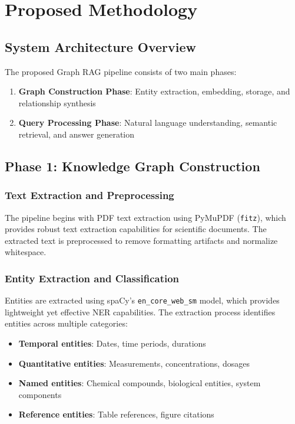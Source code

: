 \documentclass[conference]{IEEEtran}
\begin{document}
\section{Proposed Methodology}

\subsection{System Architecture Overview}
The proposed Graph RAG pipeline consists of two main phases:
\begin{enumerate}
\item \textbf{Graph Construction Phase}: Entity extraction, embedding, storage, and relationship synthesis
\item \textbf{Query Processing Phase}: Natural language understanding, semantic retrieval, and answer generation
\end{enumerate}

\subsection{Phase 1: Knowledge Graph Construction}

\subsubsection{Text Extraction and Preprocessing}
The pipeline begins with PDF text extraction using PyMuPDF (\texttt{fitz}), which provides robust text extraction capabilities for scientific documents. The extracted text is preprocessed to remove formatting artifacts and normalize whitespace.

\subsubsection{Entity Extraction and Classification}
Entities are extracted using spaCy's \texttt{en\_core\_web\_sm} model, which provides lightweight yet effective NER capabilities. The extraction process identifies entities across multiple categories:
\begin{itemize}
\item \textbf{Temporal entities}: Dates, time periods, durations
\item \textbf{Quantitative entities}: Measurements, concentrations, dosages
\item \textbf{Named entities}: Chemical compounds, biological entities, system components
\item \textbf{Reference entities}: Table references, figure citations
\end{itemize}
\end{document}
